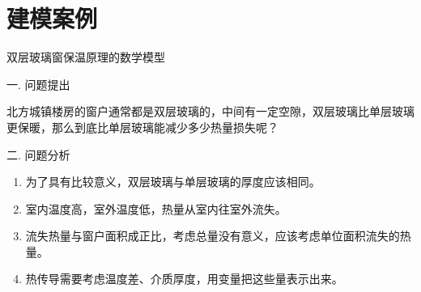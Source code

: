 \documentclass[10pt]{elegantnote}
\newcommand*{\cepubblue}{\textcolor{epubblue}}
\begin{document}
\begin{sloppypar}






\section{建模案例}

\begin{center}
    双层玻璃窗保温原理的数学模型
\end{center}

\cepubblue{一. 问题提出}

    北方城镇楼房的窗户通常都是双层玻璃的，中间有一定空隙，双层玻璃比单层玻璃更保暖，那么到底比单层玻璃能减少多少热量损失呢？

\cepubblue{二. 问题分析}

    \begin{enumerate}
      \item 为了具有比较意义，双层玻璃与单层玻璃的厚度应该相同。
      \item 室内温度高，室外温度低，热量从室内往室外流失。
      \item 流失热量与窗户面积成正比，考虑总量没有意义，应该考虑单位面积流失的热量。
      \item 热传导需要考虑温度差、介质厚度，用变量把这些量表示出来。
    \end{enumerate}


\end{sloppypar}
\end{document}
